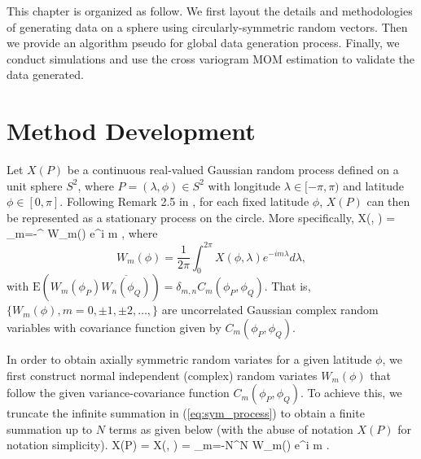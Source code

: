 This chapter is organized as follow. We first layout the details and methodologies of generating data on a sphere using circularly-symmetric random vectors. Then we provide an algorithm pseudo for global data generation process. Finally, we conduct simulations and use the cross variogram MOM estimation to validate the data generated.
		
	\section{Method Development}

Let $X(P)$ be a continuous real-valued Gaussian random process defined on a unit sphere $S^2$, where $P = (\lambda, \phi) \in S^2$ with longitude $\lambda \in [-\pi, \pi)$ and latitude $\phi \in [0, \pi]$. Following Remark 2.5 in \cite{Huang2012}, for each fixed latitude $\phi$, $X(P)$ can then be represented as a stationary process on the circle. More specifically,			
	\beq \label{eq:sym_process}
	X(\phi, \lambda) = \sum_{m=-\infty}^{\infty} W_m(\phi) e^{i m \lambda},
	\eeq
where
\[	
W_m(\phi) = \frac{1}{2\pi} \int_0^{2\pi} X(\phi, \lambda) e^{-i m \lambda} d \lambda,
\]
with $\mbox{E}(W_m(\phi_P) \overline{W_n(\phi_Q)}) = \delta_{m,n} C_m(\phi_P, \phi_Q)$. That is, $\{W_m(\phi), m = 0, \pm 1, \pm 2, \ldots,\}$ are uncorrelated Gaussian complex random variables with covariance function given by $C_m(\phi_P, \phi_Q)$.		
			
In order to obtain axially symmetric random variates for a given latitude $\phi$, we first construct normal independent (complex) random variates $W_m(\phi)$ that follow the given  variance-covariance function $C_m(\phi_P, \phi_Q)$. To achieve this, we truncate the infinite summation in (\ref{eq:sym_process}) to obtain a finite summation up to $N$ terms as given below (with the abuse of notation $X(P)$ for notation simplicity).
	\beq
	X(P) = X(\phi, \lambda) = \sum_{m=-N}^{N} W_m(\phi) e^{i m \lambda}.
	\eeq

